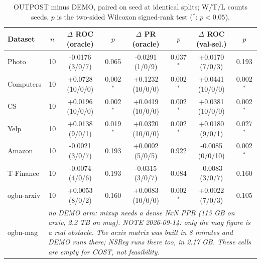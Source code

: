\begin{table}[t]
\centering
\small
\begin{tabular}{lccccccc}
\toprule
Dataset & $n$ & $\Delta$ ROC (oracle) & $p$ & $\Delta$ PR (oracle) & $p$ & $\Delta$ ROC (val-sel.) & $p$ \\
\midrule
Photo & 10 & -0.0176 (3/0/7) & 0.065 & -0.0291 (1/0/9) & 0.037$^{*}$ & +0.0170 (7/0/3) & 0.193 \\
Computers & 10 & +0.0728 (10/0/0) & 0.002$^{*}$ & +0.1232 (10/0/0) & 0.002$^{*}$ & +0.0441 (10/0/0) & 0.002$^{*}$ \\
CS & 10 & +0.0196 (10/0/0) & 0.002$^{*}$ & +0.0419 (10/0/0) & 0.002$^{*}$ & +0.0381 (10/0/0) & 0.002$^{*}$ \\
Yelp & 10 & +0.0138 (9/0/1) & 0.019$^{*}$ & +0.0320 (10/0/0) & 0.002$^{*}$ & +0.0180 (9/0/1) & 0.027$^{*}$ \\
Amazon & 10 & -0.0021 (3/0/7) & 0.193 & +0.0002 (5/0/5) & 0.922 & -0.0085 (0/0/10) & 0.002$^{*}$ \\
T-Finance & 10 & -0.0074 (4/0/6) & 0.193 & -0.0315 (3/0/7) & 0.084 & -0.0083 (3/0/7) & 0.160 \\
ogbn-arxiv & 10 & +0.0053 (8/0/2) & 0.160 & +0.0083 (10/0/0) & 0.002$^{*}$ & +0.0022 (7/0/3) & 0.105 \\
ogbn-mag & \multicolumn{7}{l}{\emph{no DEMO arm: mixup needs a dense NxN PPR (115 GB on arxiv, 2.2 TB on mag). NOTE 2026-09-14: only the mag figure is a real obstacle. The arxiv matrix was built in 8 minutes and DEMO runs there; NSReg runs there too, in 2.17 GB. These cells are empty for COST, not feasibility.}} \\
\bottomrule
\end{tabular}
\caption{OUTPOST minus DEMO, paired on seed at identical splits; W/T/L counts seeds, $p$ is the two-sided Wilcoxon signed-rank test ($^{*}$: $p<0.05$).}
\label{tab:paired_demo}
\end{table}
